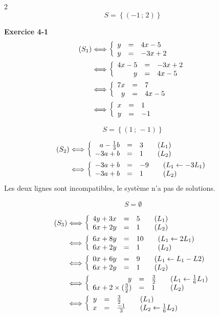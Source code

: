 \documentclass[10pt,a4paper,openany,twoside, eleve]{book}
\begin{document}
\begin{multicols}{2}
            $$S = \left\{ (-1\,;\,2) \right\}$$


\bfseries Exercice 4-1
\begin{align*}
   (S_1)
   &\Longleftrightarrow \left\{\begin{array}{rcl} y&=&4x-5 \\ y&=&-3x+2 \end{array}\right. \\
   &\Longleftrightarrow \left\{\begin{array}{rcl} 4x-5&=&-3x+2 \\ y&=&4x-5 \end{array}\right. \\
   &\Longleftrightarrow \left\{\begin{array}{rcl} 7x&=&7 \\ y&=&4x-5 \end{array}\right. \\
   &\Longleftrightarrow \left\{\begin{array}{rcl} x&=&1 \\ y&=&-1 \end{array}\right.
\end{align*}

$$S=\left\{ (1\,;\,-1) \right\}$$

\columnbreak
\begin{align*}
   (S_2)
   &\Longleftrightarrow \left\{ \begin{array}{rcll} a-\frac{1}{3}b&=&3 &\quad (L_1)\\ -3a+b&=&1 &\quad (L_2) \end{array} \right. \\
   &\Longleftrightarrow \left\{ \begin{array}{rcll} -3a+b&=&-9 &\quad (L_1\leftarrow -3L_1)\\ -3a+b&=&1 &\quad (L_2) \end{array} \right. \\
   \end{align*}
   Les deux lignes sont incompatibles, le système n'a pas de solutions.

   $$S=\emptyset$$

   \begin{align*}
      (S_3)
      &\Longleftrightarrow \left\{ \begin{array}{rcll} 4y+3x&=&5 &\quad (L_1)\\ 6x+2y&=&1 &\quad (L_2) \end{array} \right.\\
      &\Longleftrightarrow \left\{ \begin{array}{rcll} 6x+8y&=&10 &\quad (L_1\leftarrow 2L_1)\\  6x+2y&=&1 &\quad (L_2) \end{array} \right.\\
      &\Longleftrightarrow \left\{ \begin{array}{rcll} 0x+6y&=&9 &\quad (L_1\leftarrow L_1-L2)\\  6x+2y&=&1 &\quad (L_2) \end{array} \right.\\
      &\Longleftrightarrow \left\{ \begin{array}{rcll} y&=&\frac{3}{2} &\quad (L_1\leftarrow \frac{1}{6}L_1)\\  6x+2\times(\frac{3}{2})&=&1 &\quad (L_2) \end{array} \right.\\
      &\Longleftrightarrow \left\{ \begin{array}{rcll} y&=&\frac{3}{2} &\quad (L_1)\\  x&=&\frac{-1}{3} &\quad (L_2\leftarrow \frac{1}{6}L_2) \end{array} \right.\\
      \end{align*}


\end{multicols}
\end{document}
